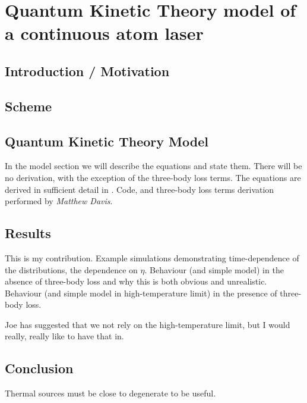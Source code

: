 \chapter{Quantum Kinetic Theory model of a continuous atom laser}
\label{KineticTheory}
\graphicspath{{Figures/KineticTheory/}{Figures/Common/}}

\section{Introduction / Motivation}

\section{Scheme}

\section{Quantum Kinetic Theory Model}
In the model section we will describe the equations and state them. There will be no derivation, with the exception of the three-body loss terms. The equations are derived in sufficient detail in \citep{Bijlsma:2000}. Code, and three-body loss terms derivation performed by \emph{Matthew Davis}.

\section{Results}
This is my contribution. Example simulations demonstrating time-dependence of the distributions, the dependence on $\eta$. Behaviour (and simple model) in the absence of three-body loss and why this is both obvious and unrealistic. Behaviour (and simple model in high-temperature limit) in the presence of three-body loss.

Joe has suggested that we not rely on the high-temperature limit, but I would really, really like to have that in.

\section{Conclusion}
Thermal sources must be close to degenerate to be useful. 